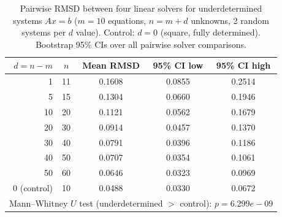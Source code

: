 \begin{table}[h]
\centering
\caption{Pairwise RMSD between four linear solvers for underdetermined systems $Ax=b$
($m=10$ equations, $n=m+d$ unknowns, 2 random systems per $d$ value).
Control: $d=0$ (square, fully determined). Bootstrap 95\% CIs over all pairwise solver comparisons.}
\label{tab:linear_solver}
\begin{tabular}{rcccc}
\toprule
$d = n - m$ & $n$ & Mean RMSD & 95\% CI low & 95\% CI high \\
\midrule
    1 &  11 & 0.1608 & 0.0855 & 0.2514 \\
    5 &  15 & 0.1304 & 0.0660 & 0.1946 \\
   10 &  20 & 0.1121 & 0.0562 & 0.1679 \\
   20 &  30 & 0.0914 & 0.0457 & 0.1370 \\
   30 &  40 & 0.0791 & 0.0396 & 0.1186 \\
   40 &  50 & 0.0707 & 0.0354 & 0.1061 \\
   50 &  60 & 0.0646 & 0.0323 & 0.0969 \\
\midrule
  0 (control) &  10 & 0.0488 & 0.0330 & 0.0672 \\
\midrule
  \multicolumn{5}{l}{Mann--Whitney $U$ test (underdetermined $>$ control): $p = 6.299e-09$} \\
\bottomrule
\end{tabular}
\end{table}

